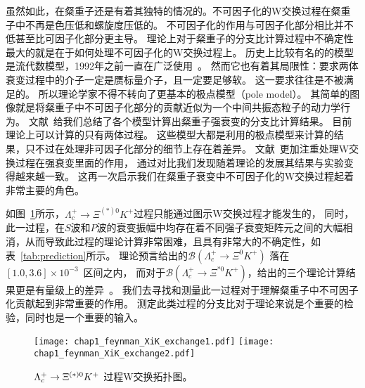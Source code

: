 虽然如此，在粲重子还是有着其独特的情况的。不可因子化的W交换过程在粲重子中不再是色压低和螺旋度压低的。
不可因子化的作用与可因子化部分相比并不低甚至比可因子化部分更主导。
理论上对于粲重子的分支比计算过程中不确定性最大的就是在于如何处理不可因子化的W交换过程上。
历史上比较有名的的模型是流代数模型，1992年之前一直在广泛使用~\cite{Cheng:1993gf}。
然而它也有着其局限性：要求两体衰变过程中的介子一定是赝标量介子，且一定要足够软。
这一要求往往是不被满足的。
所以理论学家不得不转向了更基本的极点模型（pole model）。
其简单的图像就是将粲重子中不可因子化部分的贡献近似为一个中间共振态粒子的动力学行为。
文献~\cite{Asner:2008nq}给我们总结了各个模型计算出粲重子强衰变的分支比计算结果。
目前理论上可以计算的只有两体过程。
这些模型大都是利用的极点模型来计算的结果，只不过在处理非可因子化部分的细节上存在着差异。
文献~\cite{Sharma:1998rd}更加注重处理W交换过程在强衰变里面的作用，
通过对比我们发现随着理论的发展其结果与实验变得越来越一致。
这再一次启示我们在粲重子衰变中不可因子化的W交换过程起着非常主要的角色。

如图~\ref{fig:feyman_xik}所示，$\Lambda^+_c\to \Xi^{(*)0}K^+$过程只能通过图示W交换过程才能发生的，
同时，此一过程，在$S$波和$P$波的衰变振幅中均存在着不同强子衰变矩阵元之间的大幅相消，从而导致此过程的理论计算非常困难，且具有非常大的不确定性，如表~\ref{tab:prediction}所示。
理论预言给出的$\mathcal{B}(\Lambda^+_c\to\Xi^{0}K^+)$ 落在$[1.0, 3.6] \times 10^{-3}$~\cite{Korner:1992wi,Zenczykowski:1993hw,Ivanov:1997ra, Xu:1992vc,Sharma:1998rd}区间之内，
而对于$\mathcal{B}(\Lambda^+_c\to\Xi^{*0}K^+)$，给出的三个理论计算结果更是有量级上的差异~\cite{Korner:1992wi,Xu:1992sw,Fayyazuddin:1996iy}。
我们去寻找和测量此一过程对于理解粲重子中不可因子化贡献起到非常重要的作用。
测定此类过程的分支比对于理论来说是个重要的检验，同时也是一个重要的输入。

\begin{figure}[!tbp]
\begin{center}
	\texttt{[image: chap1\_feynman\_XiK\_exchange1.pdf]}
	\texttt{[image: chap1\_feynman\_XiK\_exchange2.pdf]}
\caption{ $\Lambda_{c}^{+}\rightarrow \Xi^{(*)0}K^{+}$ 过程W交换拓扑图。}
\label{fig:feyman_xik}
\end{center}
\end{figure}

